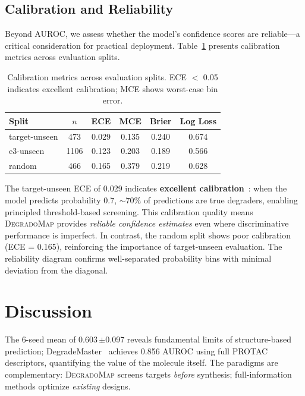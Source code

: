\documentclass[sigconf]{acmart}
\newcommand{\ours}{\textsc{DegradoMap}}
\newcommand{\spm}[1]{{\scriptsize$\pm$#1}}
\begin{document}
\subsection{Calibration and Reliability}
\label{sec:calibration}

Beyond AUROC, we assess whether the model's confidence scores are reliable---a critical consideration for practical deployment.
Table~\ref{tab:calibration} presents calibration metrics across evaluation splits.

\begin{table}[!ht]
\centering
\caption{Calibration metrics across evaluation splits. ECE $<$ 0.05 indicates excellent calibration; MCE shows worst-case bin error.}
\label{tab:calibration}
\small
\begin{tabular}{@{}lccccc@{}}
\toprule
\textbf{Split} & \textbf{$n$} & \textbf{ECE} & \textbf{MCE} & \textbf{Brier} & \textbf{Log Loss} \\
\midrule
target-unseen & 473 & 0.029 & 0.135 & 0.240 & 0.674 \\
e3-unseen & 1106 & 0.123 & 0.203 & 0.189 & 0.566 \\
random & 466 & 0.165 & 0.379 & 0.219 & 0.628 \\
\bottomrule
\end{tabular}
\end{table}

The target-unseen ECE of 0.029 indicates \textbf{excellent calibration}~\cite{guo2017calibration}: when the model predicts probability 0.7, ${\sim}70\%$ of predictions are true degraders, enabling principled threshold-based screening.
This calibration quality means \ours{} provides \emph{reliable confidence estimates} even where discriminative performance is imperfect.
In contrast, the random split shows poor calibration (ECE = 0.165), reinforcing the importance of target-unseen evaluation.
The reliability diagram confirms well-separated probability bins with minimal deviation from the diagonal.



\section{Discussion}
\label{sec:discussion}

The 6-seed mean of 0.603\,\spm{0.097} reveals fundamental limits of structure-based prediction; DegradeMaster~\cite{liu2025degrademaster} achieves 0.856 AUROC using full PROTAC descriptors, quantifying the value of the molecule itself.
The paradigms are complementary: \ours{} screens targets \emph{before} synthesis; full-information methods optimize \emph{existing} designs.
\end{document}
